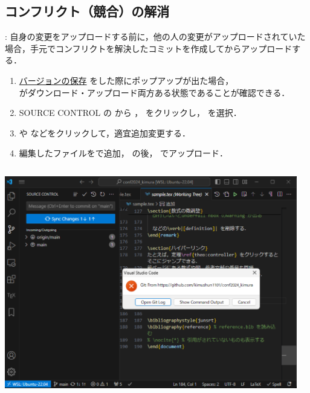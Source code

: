 \documentclass[aspectratio=169,dvipdfmx,cjk]{beamer}
\begin{document}
\subsection{コンフリクト（競合）の解消}
\begin{frame}{\insertsection \thesubsection: \insertsubsection}
  自身の変更をアップロードする前に，他の人の変更がアップロードされていた場合，手元でコンフリクトを解決したコミットを作成してからアップロードする．
  \begin{enumerate}
    \item \hyperlink{git}{バージョンの保存} をした際にポップアップが出た場合，\\
     がダウンロード・アップロード両方ある状態であることが確認できる．
    \item SOURCE CONTROL の \beamerbutton{$\cdots$} から ， をクリックし， を選択．
    \item {} や  などをクリックして，適宜追加変更する．
    \item 編集したファイルを\beamerbutton{+}で追加， の後， でアップロード．
  \end{enumerate}
  \begin{columns}
    \begin{column}{0.23\textwidth}
        \includegraphics[width=1.0\linewidth]{fig/git-conflict.png}
    \end{column}
    \begin{column}{0.23\textwidth}

\end{column}
\end{columns}
\end{frame}
\end{document}

